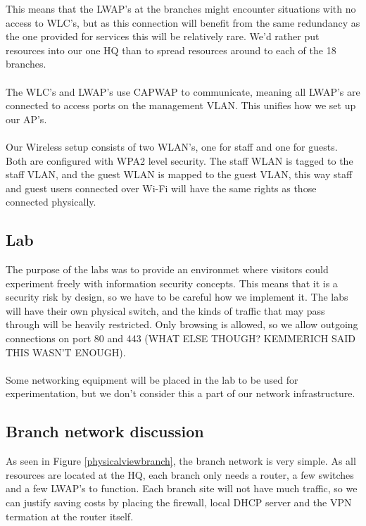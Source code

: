 This means that the LWAP's at the branches might encounter situations with no access to WLC's, but as this connection will benefit from the same redundancy as the one provided for services this will be relatively rare. We'd rather put resources into our one HQ than to spread resources around to each of the 18 branches.
\\
\\
The WLC's and LWAP's use CAPWAP to communicate, meaning all LWAP's are connected to access ports on the management VLAN. This unifies how we set up our AP's.
\\
\\
Our Wireless setup consists of two WLAN's, one for staff and one for guests. Both are configured with WPA2 level security. The staff WLAN is tagged to the staff VLAN, and the guest WLAN is mapped to the guest VLAN, this way staff and guest users connected over Wi-Fi will have the same rights as those connected physically.

\subsection{Lab}


The purpose of the labs was to provide an environmet where visitors could experiment freely with information security concepts. This means that it is a security risk by design, so we have to be careful how we implement it. The labs will have their own physical switch, and the kinds of traffic that may pass through will be heavily restricted. Only browsing is allowed, so we allow outgoing connections on port 80 and 443 (WHAT ELSE THOUGH? KEMMERICH SAID THIS WASN'T ENOUGH). 
\\
\\
Some networking equipment will be placed in the lab to be used for experimentation, but we don't consider this a part of our network infrastructure.


\subsection{Branch network discussion}


As seen in Figure \ref{physicalviewbranch}, the branch network is very simple. As all resources are located at the HQ, each branch only needs a router, a few switches and a few LWAP's to function. Each branch site will not have much traffic, so we can justify saving costs by placing the firewall, local DHCP server and the VPN termation at the router itself.

